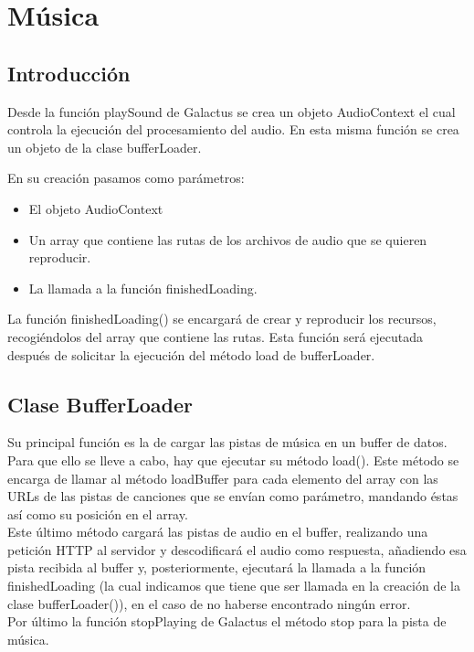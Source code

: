 \section{Música}
\label{sec:musica}

\subsection{Introducción}
\label{subsection:intro_musica}

Desde la función playSound de Galactus se crea un objeto AudioContext  el cual controla la ejecución del procesamiento del audio.
En esta misma función se crea un objeto de la clase bufferLoader. 

En su creación pasamos como parámetros: 
\begin{itemize}
 \item El objeto AudioContext
 \item Un array que contiene las rutas de los archivos de audio que se quieren reproducir.
 \item La llamada a la función  finishedLoading.
\end{itemize}

La función finishedLoading() se encargará de crear y reproducir los recursos, recogiéndolos del array que contiene las rutas. 
Esta función será ejecutada después de solicitar la ejecución del método load de bufferLoader.

\subsection{Clase BufferLoader}
\label{subsection:buffer_loader}

Su principal función es la de cargar las pistas de música en un buffer de datos.
Para que ello se lleve a cabo, hay que ejecutar su método load(). Este método se encarga de llamar al método loadBuffer para cada elemento del array con las URLs de las pistas de 
canciones que se envían como parámetro, mandando éstas así como su posición en el array. \\

Este último método cargará las pistas de audio en el buffer, realizando una petición HTTP al servidor y descodificará el audio como respuesta, añadiendo esa pista recibida al 
buffer y, posteriormente, ejecutará la llamada a la función finishedLoading (la cual indicamos que tiene que ser llamada en la creación de la clase bufferLoader()), en el caso de 
no haberse encontrado ningún error.\\

Por último la función stopPlaying de Galactus el método stop para la pista de música.
